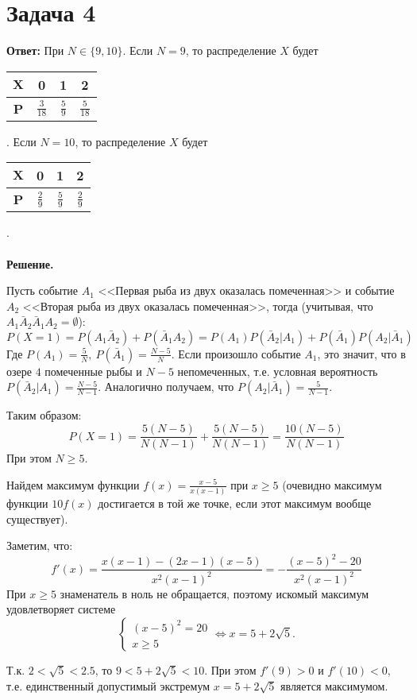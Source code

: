 \documentclass{article}
\begin{document}
\section*{Задача 4}
{\bf Ответ: } При $N\in\{9, 10\}$. Если $N=9$, то распределение $X$ будет \begin{tabular}{|c|c|c|c|}
     \hline
     $\textbf{X}$ & 0 & 1 & 2\\
     \hline
     \textbf{P} & $\frac{3}{18}$ & $\frac{5}{9}$ & $\frac{5}{18}$\\
     \hline
\end{tabular}.
Если $N=10$, то распределение $X$ будет \begin{tabular}{|c|c|c|c|}
     \hline
     $\textbf{X}$ & 0 & 1 & 2\\
     \hline
     \textbf{P} & $\frac{2}{9}$ & $\frac{5}{9}$ & $\frac{2}{9}$\\
     \hline
\end{tabular}.
\\
\\
{\bf Решение.}
\par
Пусть событие $A_1$ <<Первая рыба из двух оказалась помеченная>> и событие $A_2$ <<Вторая рыба из двух оказалась помеченная>>, тогда (учитывая, что $A_1\bar A_2 \bar A_1 A_2=\emptyset$):
$$P(X=1)=P(A_1\bar A_2)+P(\bar A_1 A_2)=P(A_1)P(\bar A_2 |A_1)+P(\bar A_1)P(A_2|\bar A_1)$$
Где $P(A_1)=\frac{5}{N},\ P(\bar A_1)=\frac{N-5}{N}$. Если произошло событие $A_1$, это значит, что в озере $4$ помеченные рыбы и $N-5$ непомеченных, т.е. условная вероятность $P(\bar A_2 |A_1)=\frac{N-5}{N-1}$. Аналогично получаем, что $P(A_2|\bar A_1)=\frac{5}{N-1}$.
\par
Таким образом:
$$P(X=1)=\frac{5(N-5)}{N(N-1)}+\frac{5(N-5)}{N(N-1)}=\frac{10(N-5)}{N(N-1)}$$
При этом $N \geq 5$. 
\par
Найдем максимум функции $f(x)=\frac{x-5}{x(x-1)}$ при $x \geq 5$ (очевидно максимум функции $10f(x)$ достигается в той же точке, если этот максимум вообще существует). 
\par
Заметим, что:
$$f'(x)=\frac{x(x-1)-(2x-1)(x-5)}{x^2(x-1)^2}=-\frac{(x-5)^2-20}{x^2(x-1)^2}$$
При $x \geq 5$ знаменатель в ноль не обращается, поэтому искомый максимум удовлетворяет системе 
$$\begin{cases}(x-5)^2=20\\x \geq 5\end{cases}\Leftrightarrow x=5+2\sqrt{5}.$$
\par
Т.к. $2 < \sqrt{5} < 2.5$, то $9 < 5+2\sqrt{5} < 10$. При этом $f'(9) > 0$ и $f'(10) < 0$, т.е. единственный допустимый экстремум $x=5+2\sqrt{5}$ является максимумом. 
\end{document}
